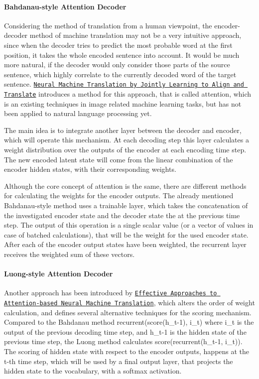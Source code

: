 \paragraph*{Bahdanau-\/style Attention Decoder}

Considering the method of translation from a human viewpoint, the encoder-\/decoder method of machine translation may not be a very intuitive approach, since when the decoder tries to predict the most probable word at the first position, it takes the whole encoded sentence into account. It would be much more natural, if the decoder would only consider those parts of the source sentence, which highly correlate to the currently decoded word of the target sentence. \href{https://arxiv.org/abs/1409.0473}{\tt Neural Machine Translation by Jointly Learning to Align and Translate} introduces a method for this approach, that is called attention, which is an existing techniques in image related machine learning tasks, but has not been applied to natural language processing yet.

The main idea is to integrate another layer between the decoder and encoder, which will operate this mechanism. At each decoding step this layer calculates a weight distribution over the outputs of the encoder at each encoding time step. The new encoded latent state will come from the linear combination of the encoder hidden states, with their corresponding weights.



Although the core concept of attention is the same, there are different methods for calculating the weights for the encoder outputs. The already mentioned Bahdanau-\/style method uses a trainable layer, which takes the concatenation of the investigated encoder state and the decoder state the at the previous time step. The output of this operation is a single scalar value (or a vector of values in case of batched calculations), that will be the weight for the used encoder state. After each of the encoder output states have been weighted, the recurrent layer receives the weighted sum of these vectors.

\paragraph*{Luong-\/style Attention Decoder}

Another approach has been introduced by \href{https://arxiv.org/abs/1508.04025}{\tt Effective Approaches to Attention-\/based Neural Machine Translation}, which alters the order of weight calculation, and defines several alternative techniques for the scoring mechanism. Compared to the Bahdanau method {\ttfamily recurrent(score(h\+\_\+t-\/1), i\+\_\+t)} where i\+\_\+t is the output of the previous decoding time step, and h\+\_\+t-\/1 is the hidden state of the previous time step, the Luong method calculates {\ttfamily score(recurrent(h\+\_\+t-\/1, i\+\_\+t))}. The scoring of hidden state with respect to the encoder outputs, happens at the t-\/th time step, which will be used by a final output layer, that projects the hidden state to the vocabulary, with a softmax activation.

